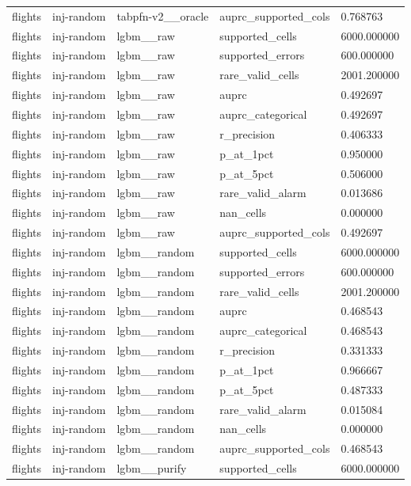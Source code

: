 \begin{tabular}{lllll}
flights & inj-random & tabpfn-v2\_\_oracle & auprc\_supported\_cols & 0.768763 \\
flights & inj-random & lgbm\_\_raw & supported\_cells & 6000.000000 \\
flights & inj-random & lgbm\_\_raw & supported\_errors & 600.000000 \\
flights & inj-random & lgbm\_\_raw & rare\_valid\_cells & 2001.200000 \\
flights & inj-random & lgbm\_\_raw & auprc & 0.492697 \\
flights & inj-random & lgbm\_\_raw & auprc\_categorical & 0.492697 \\
flights & inj-random & lgbm\_\_raw & r\_precision & 0.406333 \\
flights & inj-random & lgbm\_\_raw & p\_at\_1pct & 0.950000 \\
flights & inj-random & lgbm\_\_raw & p\_at\_5pct & 0.506000 \\
flights & inj-random & lgbm\_\_raw & rare\_valid\_alarm & 0.013686 \\
flights & inj-random & lgbm\_\_raw & nan\_cells & 0.000000 \\
flights & inj-random & lgbm\_\_raw & auprc\_supported\_cols & 0.492697 \\
flights & inj-random & lgbm\_\_random & supported\_cells & 6000.000000 \\
flights & inj-random & lgbm\_\_random & supported\_errors & 600.000000 \\
flights & inj-random & lgbm\_\_random & rare\_valid\_cells & 2001.200000 \\
flights & inj-random & lgbm\_\_random & auprc & 0.468543 \\
flights & inj-random & lgbm\_\_random & auprc\_categorical & 0.468543 \\
flights & inj-random & lgbm\_\_random & r\_precision & 0.331333 \\
flights & inj-random & lgbm\_\_random & p\_at\_1pct & 0.966667 \\
flights & inj-random & lgbm\_\_random & p\_at\_5pct & 0.487333 \\
flights & inj-random & lgbm\_\_random & rare\_valid\_alarm & 0.015084 \\
flights & inj-random & lgbm\_\_random & nan\_cells & 0.000000 \\
flights & inj-random & lgbm\_\_random & auprc\_supported\_cols & 0.468543 \\
flights & inj-random & lgbm\_\_purify & supported\_cells & 6000.000000 \\

\end{tabular}
